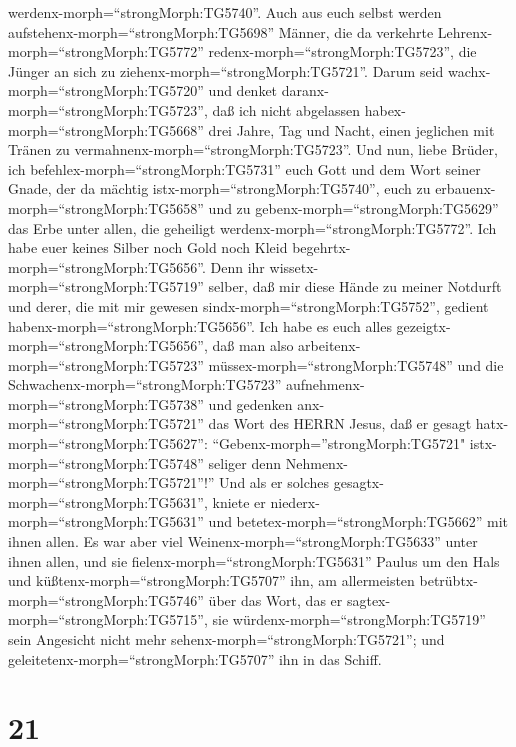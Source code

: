 werdenx-morph=``strongMorph:TG5740''.  Auch aus euch selbst
werden aufstehenx-morph=``strongMorph:TG5698'' Männer, die da verkehrte
Lehrenx-morph=``strongMorph:TG5772''
redenx-morph=``strongMorph:TG5723'', die Jünger an sich zu
ziehenx-morph=``strongMorph:TG5721''.  Darum seid
wachx-morph=``strongMorph:TG5720'' und denket
daranx-morph=``strongMorph:TG5723'', daß ich nicht abgelassen
habex-morph=``strongMorph:TG5668'' drei Jahre, Tag und Nacht, einen
jeglichen mit Tränen zu vermahnenx-morph=``strongMorph:TG5723''.
 Und nun, liebe Brüder, ich
befehlex-morph=``strongMorph:TG5731'' euch Gott und dem Wort seiner
Gnade, der da mächtig istx-morph=``strongMorph:TG5740'', euch zu
erbauenx-morph=``strongMorph:TG5658'' und zu
gebenx-morph=``strongMorph:TG5629'' das Erbe unter allen, die geheiligt
werdenx-morph=``strongMorph:TG5772''.  Ich habe euer keines
Silber noch Gold noch Kleid begehrtx-morph=``strongMorph:TG5656''.
 Denn ihr wissetx-morph=``strongMorph:TG5719'' selber, daß
mir diese Hände zu meiner Notdurft und derer, die mit mir gewesen
sindx-morph=``strongMorph:TG5752'', gedient
habenx-morph=``strongMorph:TG5656''.  Ich habe es euch
alles gezeigtx-morph=``strongMorph:TG5656'', daß man also
arbeitenx-morph=``strongMorph:TG5723''
müssex-morph=``strongMorph:TG5748'' und die
Schwachenx-morph=``strongMorph:TG5723''
aufnehmenx-morph=``strongMorph:TG5738'' und gedenken
anx-morph=``strongMorph:TG5721'' das Wort des HERRN Jesus, daß er gesagt
hatx-morph=``strongMorph:TG5627'': ``Gebenx-morph=''strongMorph:TG5721"
istx-morph=``strongMorph:TG5748'' seliger denn
Nehmenx-morph=``strongMorph:TG5721''!''  Und als er solches
gesagtx-morph=``strongMorph:TG5631'', kniete er
niederx-morph=``strongMorph:TG5631'' und
betetex-morph=``strongMorph:TG5662'' mit ihnen allen.  Es
war aber viel Weinenx-morph=``strongMorph:TG5633'' unter ihnen allen,
und sie fielenx-morph=``strongMorph:TG5631'' Paulus um den Hals und
küßtenx-morph=``strongMorph:TG5707'' ihn,  am allermeisten
betrübtx-morph=``strongMorph:TG5746'' über das Wort, das er
sagtex-morph=``strongMorph:TG5715'', sie
würdenx-morph=``strongMorph:TG5719'' sein Angesicht nicht mehr
sehenx-morph=``strongMorph:TG5721''; und
geleitetenx-morph=``strongMorph:TG5707'' ihn in das Schiff.

\hypertarget{section-20}{%
\section{21}\label{section-20}}

